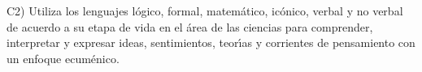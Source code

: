 C2) Utiliza los lenguajes l\'{o}gico, formal, matem\'{a}tico, ic\'{o}nico, verbal
y no verbal de acuerdo a su etapa de vida en el \'{a}rea de las ciencias
para comprender, interpretar y expresar ideas, sentimientos, teor\'{\i}as y
corrientes de pensamiento con un enfoque ecum\'{e}nico.
